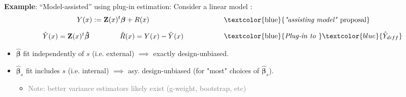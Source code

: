 \documentclass[
  ignorenonframetext,
  aspectratio=169,
]{beamer}
\begin{document}
\begin{frame}{\textbf{Example}: ``Model-assisted'' using plug-in
estimation:}
\label{model-assisted-using-plug-in-estimation}
Consider a linear model : \vspace{2em} \[
\begin{array}{c @{\hspace{2cm}} l}
\begin{aligned}
Y(x):= \mathbf{Z}(x)^t\boldsymbol{\beta} + R(x)
\end{aligned}
& \text{\textcolor{blue}{\textit{"assisting model"} proposal}} \\[10pt]
\begin{aligned}
\hat{Y}(x) = \mathbf{Z}(x)^t\boldsymbol{\hat\beta}
\hspace{1.5cm}
\hat{R}(x) = Y(x) - \hat{Y}(x)
\end{aligned}
& \text{\textcolor{blue}{\textit{Plug-in to }}} \textcolor{blue}{\hat{Y}_{diff}}
\end{array}
\]

\begin{itemize}
\item[-] $\hat{\boldsymbol{\beta}}$ fit independently of $s$ (i.e. external) $\implies$ exactly design-unbiased.
\item[-] $\hat{\boldsymbol{\beta}}_s$ fit includes $s$ (i.e. internal) $\implies$ asy. design-unbiased (for "most" choices of $\hat{\boldsymbol{\beta}}_s$).
\begin{itemize}
\item[] \textcolor{gray}{Note: better variance estimators likely exist (g-weight, bootstrap, etc)}
\end{itemize}
\end{itemize}
\end{frame}
\end{document}
